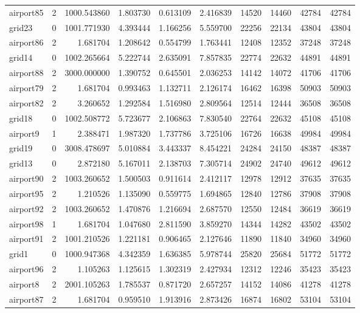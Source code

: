 \begin{longtable}{|l|r|r|r|r|r|r|r|r|r|}
airport85 & 2 & 1000.543860 & 1.803730 & 0.613109 & 2.416839 & 14520 & 14460 & 42784 & 42784 \\
grid23 & 0 & 1001.771930 & 4.393444 & 1.166256 & 5.559700 & 22256 & 22134 & 43804 & 43804 \\
airport86 & 2 & 1.681704 & 1.208642 & 0.554799 & 1.763441 & 12408 & 12352 & 37248 & 37248 \\
grid14 & 0 & 1002.265664 & 5.222744 & 2.635091 & 7.857835 & 22774 & 22632 & 44891 & 44891 \\
airport88 & 2 & 3000.000000 & 1.390752 & 0.645501 & 2.036253 & 14142 & 14072 & 41706 & 41706 \\
airport79 & 2 & 1.681704 & 0.993463 & 1.132711 & 2.126174 & 16462 & 16398 & 50903 & 50903 \\
airport82 & 2 & 3.260652 & 1.292584 & 1.516980 & 2.809564 & 12514 & 12444 & 36508 & 36508 \\
grid18 & 0 & 1002.508772 & 5.723677 & 2.106863 & 7.830540 & 22764 & 22632 & 45108 & 45108 \\
airport9 & 1 & 2.388471 & 1.987320 & 1.737786 & 3.725106 & 16726 & 16638 & 49984 & 49984 \\
grid19 & 0 & 3008.478697 & 5.010884 & 3.443337 & 8.454221 & 24284 & 24150 & 48387 & 48387 \\
grid13 & 0 & 2.872180 & 5.167011 & 2.138703 & 7.305714 & 24902 & 24740 & 49612 & 49612 \\
airport90 & 2 & 1003.260652 & 1.500503 & 0.911614 & 2.412117 & 12978 & 12912 & 37635 & 37635 \\
airport95 & 2 & 1.210526 & 1.135090 & 0.559775 & 1.694865 & 12840 & 12786 & 37908 & 37908 \\
airport92 & 2 & 1003.260652 & 1.470876 & 1.216694 & 2.687570 & 12550 & 12484 & 36619 & 36619 \\
airport98 & 1 & 1.681704 & 1.047680 & 2.811590 & 3.859270 & 14344 & 14282 & 43502 & 43502 \\
airport91 & 2 & 1001.210526 & 1.221181 & 0.906465 & 2.127646 & 11890 & 11840 & 34960 & 34960 \\
grid1 & 0 & 1000.947368 & 4.342359 & 1.636385 & 5.978744 & 25820 & 25684 & 51772 & 51772 \\
airport96 & 2 & 1.105263 & 1.125615 & 1.302319 & 2.427934 & 12312 & 12246 & 35423 & 35423 \\
airport8 & 2 & 2001.105263 & 1.785537 & 0.871720 & 2.657257 & 14152 & 14086 & 41278 & 41278 \\
airport87 & 2 & 1.681704 & 0.959510 & 1.913916 & 2.873426 & 16874 & 16802 & 53104 & 53104 \\

\end{longtable}
